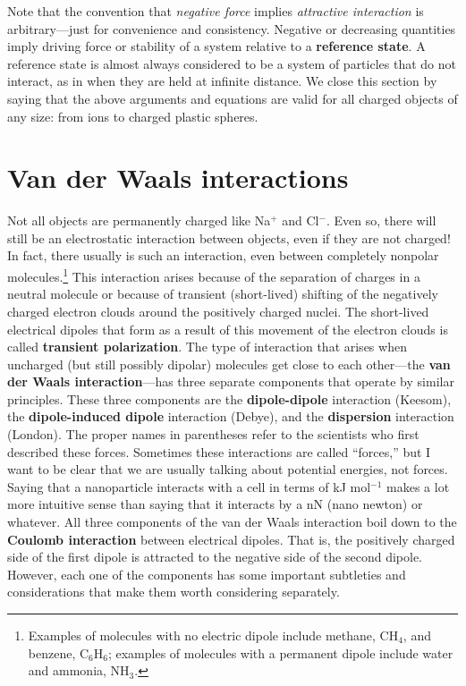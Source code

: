     Note that the convention that \textit{negative force} implies \textit{attractive interaction} is arbitrary---just for convenience and consistency. Negative or decreasing quantities imply driving force or stability of a system relative to a \textbf{reference state}. A reference state is almost always considered to be a system of particles that do not interact, as in when they are held at infinite distance. We close this section by saying that the above arguments and equations are valid for all charged objects of any size: from ions to charged plastic spheres.

\section{Van der Waals interactions} 

Not all objects are permanently charged like Na$^+$ and Cl$^-$. Even so, there will still be an electrostatic interaction between objects, even if they are not charged! In fact, there usually is such an interaction, even between completely nonpolar molecules.\footnote{Examples of molecules with no electric dipole include methane, CH$_4$, and benzene, C$_6$H$_6$; examples of molecules with a permanent dipole include water and ammonia, NH$_3$.} This interaction arises because of the separation of charges in a neutral molecule or because of transient (short-lived) shifting of the negatively charged electron clouds around the positively charged nuclei. The short-lived electrical dipoles that form as a result of this movement of the electron clouds is called \textbf{transient polarization}. The type of interaction that arises when uncharged (but still possibly dipolar) molecules get close to each other---the \textbf{van der Waals interaction}---has three separate components that operate by similar principles. These three components are the \textbf{dipole-dipole} interaction (Keesom), the \textbf{dipole-induced dipole} interaction (Debye), and the \textbf{dispersion} interaction (London). The proper names in parentheses refer to the scientists who first described these forces. Sometimes these interactions are called ``forces,'' but I want to be clear that we are usually talking about potential energies, not forces. Saying that a nanoparticle interacts with a cell in terms of kJ mol$^{-1}$ makes a lot more intuitive sense than saying that it interacts by a nN (nano newton) or whatever. All three components of the van der Waals interaction boil down to the \textbf{Coulomb interaction} between electrical dipoles. That is, the positively charged side of the first dipole is attracted to the negative side of the second dipole. However, each one of the components has some important subtleties and considerations that make them worth considering separately.

